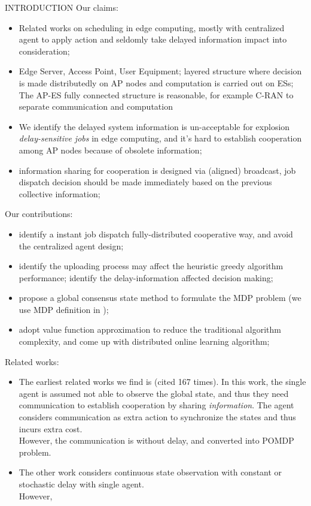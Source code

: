 \documentclass[10pt, conference, letterpaper]{IEEEtran}
\begin{document}
    \begin{section}{INTRODUCTION}
        \label{sec:introduction}
        Our claims:
        \begin{itemize}
            \item Related works on scheduling in edge computing, mostly with centralized agent to apply action and seldomly take delayed information impact into consideration;
            \item Edge Server, Access Point, User Equipment; layered structure where decision is made distributedly on AP nodes and computation is carried out on ESs; The AP-ES fully connected structure is reasonable, for example C-RAN to separate communication and computation 
            \item We identify the delayed system information is un-acceptable for explosion \emph{delay-sensitive jobs} in edge computing, and it's hard to establish cooperation among AP nodes because of obsolete information;
            \item information sharing for cooperation is designed via (aligned) broadcast, job dispatch decision should be made immediately based on the previous collective information;
        \end{itemize}

        Our contributions:
        \begin{itemize}
            \item identify a instant job dispatch fully-distributed cooperative way, and avoid the centralized agent design;
            \item identify the uploading process may affect the heuristic greedy algorithm performance; identify the delay-information affected decision making;
            \item propose a global consensus state method to formulate the MDP problem (we use MDP definition in \cite{sutton1998introduction});
            \item adopt value function approximation to reduce the traditional algorithm complexity, and come up with distributed online learning algorithm;
        \end{itemize}

        Related works:
        \begin{itemize}
            \item The earliest related works we find is \cite{ref-01} (cited 167 times). In this work, the single agent is assumed not able to observe the global state, and thus they need communication to establish cooperation by sharing \emph{information}. The agent considers communication as extra action to synchronize the states and thus incurs extra cost. \\
            However, the communication is without delay, and converted into POMDP problem.
            \item The other work \cite{ref-02} considers continuous state observation with constant or stochastic delay with single agent. \\
            However, 
        \end{itemize}


\end{section}
\end{document}

